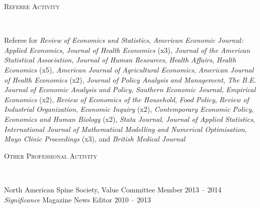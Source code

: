 \documentclass[9pt]{article}
\newenvironment{changemargin}[2]{%
  \begin{list}{}{%
    \setlength{\topsep}{0pt}%
    \setlength{\leftmargin}{#1}%
    \setlength{\rightmargin}{#2}%
    \setlength{\listparindent}{\parindent}%
    \setlength{\itemindent}{\parindent}%
    \setlength{\parsep}{\parskip}%
  }%
  \item[]}{\end{list}
}
\newcommand{\lineover}{
	\begin{changemargin}{-0.05in}{-0.05in}
		\vspace*{-8pt}
		\hrulefill \\
		\vspace*{-2pt}
	\end{changemargin}
}
\newcommand{\header}[1]{
	\begin{changemargin}{-0.5in}{-0.5in}
		\scshape{#1}\\
  	\lineover
	\end{changemargin}
}
\newenvironment{body} {
	\vspace*{-16pt}
	\begin{changemargin}{-0.25in}{-0.5in}
  }	
	{\end{changemargin}
}
\begin{document}
\header{Referee Activity}
\begin{body}
  \vspace{14pt}
  Referee for \textit{Review of Economics and Statistics}, \textit{American Economic Journal: Applied Economics}, \textit{Journal of Health Economics} (x3), \textit{Journal of the American Statistical Association}, \textit{Journal of Human Resources}, \textit{Health Affairs}, \textit{Health Economics} (x5), \textit{American Journal of Agricultural Economics}, \textit{American Journal of Health Economics} (x2), \textit{Journal of Policy Analysis and Management}, \textit{The B.E. Journal of Economic Analysis and Policy}, \textit{Southern Economic Journal}, \textit{Empirical Economics} (x2), \textit{Review of Economics of the Household}, \textit{Food Policy}, \textit{Review of Industrial Organization}, \textit{Economic Inquiry} (x2), \textit{Contemporary Economic Policy}, \textit{Economics and Human Biology} (x2), \textit{Stata Journal}, \textit{Journal of Applied Statistics}, \textit{International Journal of Mathematical Modelling and Numerical Optimisation}, \textit{Mayo Clinic Proceedings} (x3), and \textit{British Medical Journal}
\end{body}
\smallskip

\header{Other Professional Activity}
\begin{body}
  \vspace{14pt}
  North American Spine Society, Value Committee Member \hfill 2013 -- 2014 \\
  \textit{Significance} Magazine News Editor \hfill 2010 -- 2013
\end{body}
\smallskip
\end{document}
